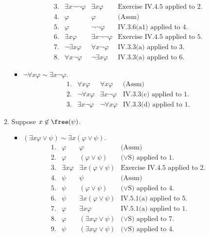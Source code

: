 \begin{enumerate}[1.]
\begin{enumerate}[(1)]
\begin{itemize}
\[\begin{array}{llll}
3. & \exists x \neg \neg \varphi & \exists x \varphi & \mbox{Exercise IV.4.5 applied to 2.} \\
4. & \varphi & \varphi & \mbox{(Assm)} \\
5. & \varphi & \neg \neg \varphi & \mbox{IV.3.6(a1) applied to 4.} \\
6. & \exists x \varphi & \exists x \neg \neg \varphi & \mbox{Exercise IV.4.5 applied to 5.} \\
7. & \neg \exists x \varphi & \forall x \neg \varphi & \mbox{IV.3.3(a) applied to 3.} \\
8. & \forall x \neg \varphi & \neg \exists x \varphi & \mbox{IV.3.3(a) applied to 6.}
\end{array}
\]
\item $\neg \forall x \varphi \sim \exists x \neg \varphi$.
\[
\begin{array}{llll}
1. & \forall x \varphi & \forall x \varphi & \mbox{(Assm)} \\
2. & \neg \forall x \varphi & \exists x \neg \varphi & \mbox{IV.3.3(c) applied to 1.} \\
3. & \exists x \neg \varphi & \neg \forall x \varphi & \mbox{IV.3.3(d) applied to 1.}
\end{array}
\]
\end{itemize}
\item Suppose $x \not \in \free(\psi)$.
\begin{itemize}
\item $(\exists x \varphi \lor \psi) \sim \exists x (\varphi \lor \psi)$.
\[
\begin{array}{llll}
1. & \varphi & \varphi & \mbox{(Assm)} \\
2. & \varphi & (\varphi \lor \psi) & \mbox{($\lor$S) applied to 1.} \\
3. & \exists x \varphi & \exists x (\varphi \lor \psi) & \mbox{Exercise IV.4.5 applied to 2.} \\
4. & \psi & \psi & \mbox{(Assm)} \\
5. & \psi & (\varphi \lor \psi) & \mbox{($\lor$S) applied to 4.} \\
6. & \psi & \exists x (\varphi \lor \psi) & \mbox{IV.5.1(a) applied to 5.} \\
7. & \varphi & \exists x \varphi & \mbox{IV.5.1(a) applied to 1.} \\
8. & \varphi & (\exists x \varphi \lor \psi) & \mbox{($\lor$S) applied to 7.} \\
9. & \psi & (\exists x \varphi \lor \psi) & \mbox{($\lor$S) applied to 4.} \\

\end{array}\]
\end{itemize}
\end{enumerate}
\end{enumerate}
